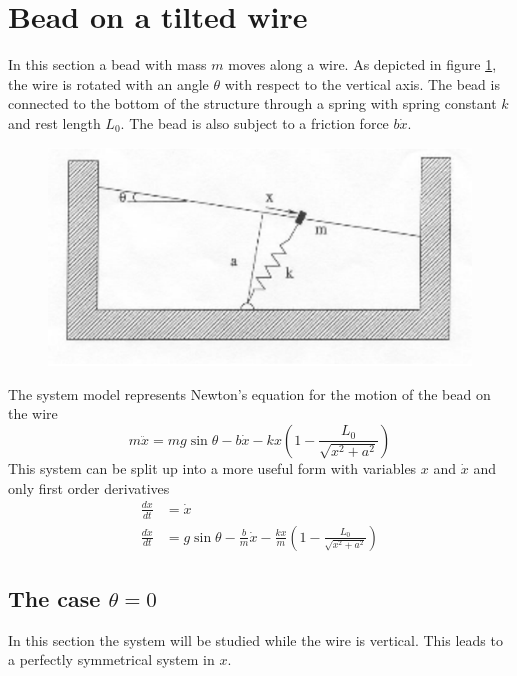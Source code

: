 \section{Bead on a tilted wire}
In this section a bead with mass $m$ moves along a wire. As depicted in figure  \ref{fig:ex1beadeps}, the wire is rotated with an angle $\theta$ with respect to the vertical axis. The bead is connected to the bottom of the structure through a spring with spring constant $k$ and rest length $L_0$. The bead is also subject to a friction force $b\dot{x}$. 

\begin{figure}[htp]
\centering
\includegraphics{img/ex1/bead.eps}
\caption{}
\label{fig:ex1beadeps}
\end{figure}

The system model represents Newton's equation for the motion of the bead on the wire
\begin{equation}
m\ddot{x}=mg\sin{\theta} -b\dot{x}-kx\left(1-\frac{L_0}{\sqrt{x^2+a^2}}\right)\label{eqn:newton2order}
\end{equation}
This system can be split up into a more useful form with variables $x$ and $\dot{x}$ and only first order derivatives
 \begin{align}
 \frac{dx}{dt}&=\dot{x}\label{eqn:dxdt}\\
 \frac{d\dot{x}}{dt}&=g\sin{\theta}-\frac{b}{m}\dot{x}-\frac{kx}{m}\left(1-\frac{L_0}{\sqrt{x^2+a^2}}\right)\label{eqn:ddotdt}
 \end{align}
 
 
\subsection{The case $\theta=0$}\label{sec:ex1theta0}
In this section the system will be studied while the wire is vertical. This leads to a perfectly symmetrical system in $x$. 
